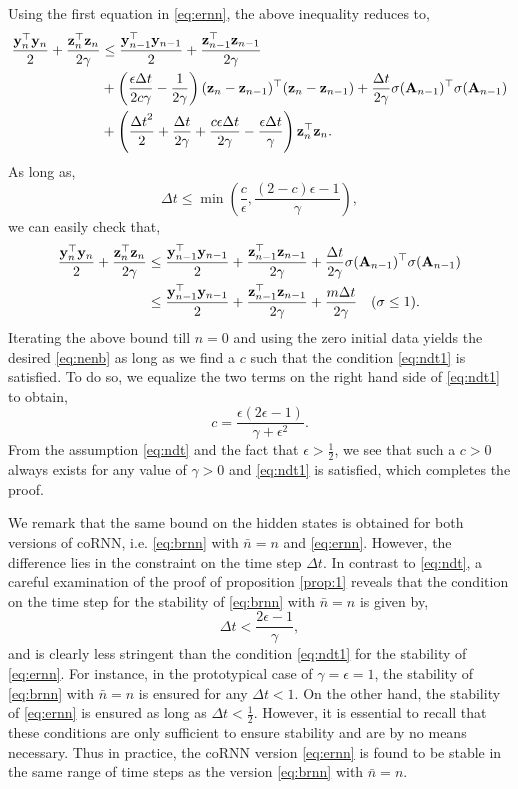 \documentclass{article} \usepackage{iclr2021_conference,times}
\newcommand{\by}{{\bf y}}
\newcommand{\bz}{{\bf z}}
\newcommand{\bA}{{\bf A}}
\newcommand{\ep}{\epsilon}
\newcommand{\Dt}{{\Delta t}}
\begin{document}
Using the first equation in \eqref{eq:ernn}, the above inequality reduces to,
\begin{align*}
\frac{\by_n^\top \by_n}{2} + \frac{\bz_n^\top \bz_n}{2\gamma} &\leq \frac{\by_{n-1}^\top \by_{n-1}}{2} + \frac{\bz_{n-1}^\top \bz_{n-1}}{2\gamma} \\
&+\left(\frac{\ep \Dt}{2 c \gamma} - \frac{1}{2 \gamma}\right)(\bz_n- \bz_{n-1})^\top (\bz_n- \bz_{n-1})
+ \frac{\Dt}{2\gamma}\sigma(\bA_{n-1})^\top \sigma(\bA_{n-1}) \\
&+ \left(\frac{\Dt^2}{2} + \frac{\Dt}{2\gamma} + \frac{c \ep \Dt}{2 \gamma} - \frac{\ep \Dt}{\gamma}\right) \bz_n^{\top}\bz_n.
\end{align*}
As long as,
\begin{equation}
    \label{eq:ndt1}
    \Dt \leq \min \left(\frac{c}{\epsilon}, \frac{(2-c)\ep-1}{\gamma}\right),
\end{equation}
we can easily check that,
\begin{align*}
\frac{\by_n^\top \by_n}{2} + \frac{\bz_n^\top \bz_n}{2\gamma} &\leq \frac{\by_{n-1}^\top \by_{n-1}}{2} + \frac{\bz_{n-1}^\top \bz_{n-1}}{2\gamma} + \frac{\Dt}{2\gamma}\sigma(\bA_{n-1})^\top \sigma(\bA_{n-1}) \\
&\leq \frac{\by_{n-1}^\top \by_{n-1}}{2} + \frac{\bz_{n-1}^\top \bz_{n-1}}{2\gamma} + \frac{m\Dt}{2\gamma}\quad (\sigma \leq 1).
\end{align*}
Iterating the above bound till $n=0$ and using the zero initial data yields the desired \eqref{eq:nenb} as long as we find a $c$ such that the condition \eqref{eq:ndt1} is satisfied. To do so, we equalize the two terms on the right hand side of \eqref{eq:ndt1} to obtain, 
$$
c = \frac{\ep(2\ep-1)}{\gamma + \ep^2}.
$$
From the assumption \eqref{eq:ndt} and the fact that $\ep > \frac{1}{2}$, we see that such a $c > 0$ always exists for any value of $\gamma > 0$ and \eqref{eq:ndt1} is satisfied, which completes the proof.

We remark that the same bound on the hidden states is obtained for both versions of coRNN, i.e. \eqref{eq:brnn} with $\bar{n} = n$ and \eqref{eq:ernn}. However, the difference lies in the constraint on the time step $\Dt$. In contrast to \eqref{eq:ndt}, a careful examination of the proof of proposition \ref{prop:1} reveals that the condition on the time step for the stability of \eqref{eq:brnn} with $\bar{n} = n$ is given by,
\begin{equation}
    \label{eq:dt}
    \Dt < \frac{2\ep -1}{\gamma},
\end{equation}
and is clearly less stringent than the condition \eqref{eq:ndt1} for the stability of \eqref{eq:ernn}. For instance, in the prototypical case of $\gamma = \ep =1$, the stability of \eqref{eq:brnn} with $\bar{n} = n$ is ensured for any $\Dt < 1$. On the other hand, the stability of \eqref{eq:ernn} is ensured as long as $\Dt < \frac{1}{2}$. However, it is essential to recall that these conditions are only sufficient to ensure stability and are by no means necessary. Thus in practice, the coRNN version \eqref{eq:ernn} is found to be stable in the same range of time steps as the version \eqref{eq:brnn} with $\bar{n} = n$. 
\end{document}
